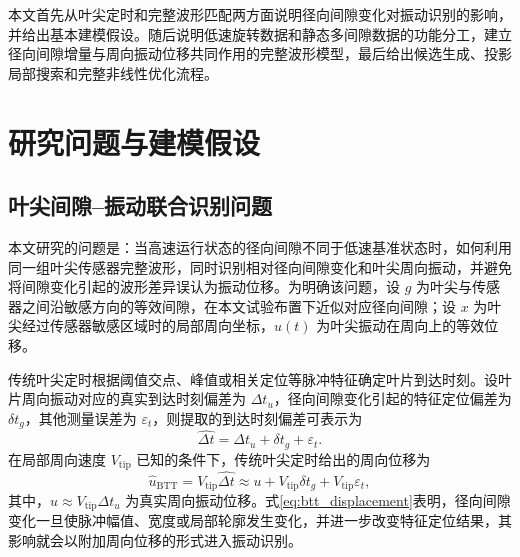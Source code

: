 \documentclass[UTF8,12pt,a4paper]{ctexart}
\begin{document}
本文首先从叶尖定时和完整波形匹配两方面说明径向间隙变化对振动识别的影响，并给出基本建模假设。随后说明低速旋转数据和静态多间隙数据的功能分工，建立径向间隙增量与周向振动位移共同作用的完整波形模型，最后给出候选生成、投影局部搜索和完整非线性优化流程。

\section{研究问题与建模假设}

\subsection{叶尖间隙--振动联合识别问题}

本文研究的问题是：当高速运行状态的径向间隙不同于低速基准状态时，如何利用同一组叶尖传感器完整波形，同时识别相对径向间隙变化和叶尖周向振动，并避免将间隙变化引起的波形差异误认为振动位移。为明确该问题，设 $g$ 为叶尖与传感器之间沿敏感方向的等效间隙，在本文试验布置下近似对应径向间隙；设 $x$ 为叶尖经过传感器敏感区域时的局部周向坐标，$u(t)$ 为叶尖振动在周向上的等效位移。

传统叶尖定时根据阈值交点、峰值或相关定位等脉冲特征确定叶片到达时刻。设叶片周向振动对应的真实到达时刻偏差为 $\Delta t_u$，径向间隙变化引起的特征定位偏差为 $\delta t_g$，其他测量误差为 $\varepsilon_t$，则提取的到达时刻偏差可表示为
\begin{equation}
\widehat{\Delta t}=\Delta t_u+\delta t_g+\varepsilon_t.
\label{eq:btt_time_error}
\end{equation}
在局部周向速度 $V_{\mathrm{tip}}$ 已知的条件下，传统叶尖定时给出的周向位移为
\begin{equation}
\widehat u_{\mathrm{BTT}}
=V_{\mathrm{tip}}\widehat{\Delta t}
\approx u+V_{\mathrm{tip}}\delta t_g+V_{\mathrm{tip}}\varepsilon_t,
\label{eq:btt_displacement}
\end{equation}
其中，$u\approx V_{\mathrm{tip}}\Delta t_u$ 为真实周向振动位移。式\eqref{eq:btt_displacement}表明，径向间隙变化一旦使脉冲幅值、宽度或局部轮廓发生变化，并进一步改变特征定位结果，其影响就会以附加周向位移的形式进入振动识别。
\end{document}
